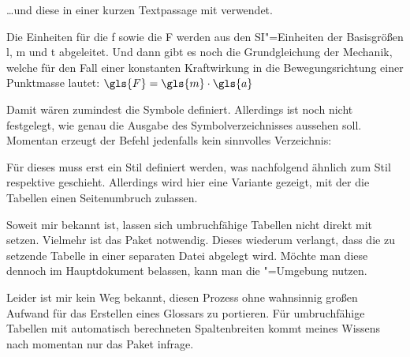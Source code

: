 \documentclass[%
  english,ngerman,%
  geometry=no,DIV=12,automark,%
]{tudscrartcl}
\begin{document}
%
\dots und diese in einer kurzen Textpassage mit  
verwendet.
%
\begin{Hint}
Die Einheiten für die \gls{f} sowie die \gls{F} werden aus den 
SI"=Einheiten der Basisgrößen \gls{l}, \gls{m} und \gls{t} abgeleitet.
Und dann gibt es noch die Grundgleichung der Mechanik, welche für den
Fall einer konstanten Kraftwirkung in die Bewegungsrichtung einer
Punktmasse lautet:
$\gls{F} = \gls{m} \cdot \gls{a}$
\end{Hint}
%
Damit wären zumindest die Symbole definiert. Allerdings ist noch nicht 
festgelegt, wie genau die Ausgabe des Symbolverzeichnisses aussehen soll. 
Momentan erzeugt der Befehl  jedenfalls kein sinnvolles 
Verzeichnis:
%
\begin{Hint*}
\printsymbols
\end{Hint*}
\begin{quoting}[rightmargin=0pt]
\vspace*{-\baselineskip}
\glsdisablehyper
\InputExcerpt
\end{quoting}
%
Für dieses muss erst ein Stil definiert werden, was nachfolgend ähnlich zum 
Stil  respektive  geschieht. Allerdings 
wird hier eine Variante gezeigt, mit der die Tabellen einen Seitenumbruch 
zulassen.

Soweit mir bekannt ist, lassen sich umbruchfähige Tabellen nicht direkt mit 
 setzen. Vielmehr ist das Paket  
notwendig. Dieses wiederum verlangt, dass die zu setzende Tabelle in einer 
separaten Datei abgelegt wird. Möchte man diese dennoch im Hauptdokument 
belassen, kann man die "=Umgebung nutzen.

Leider ist mir kein Weg bekannt, diesen Prozess ohne wahnsinnig großen Aufwand 
für das Erstellen eines Glossars zu portieren. Für umbruchfähige Tabellen mit 
automatisch berechneten Spaltenbreiten kommt meines Wissens nach momentan nur 
das Paket  infrage.
\end{document}
